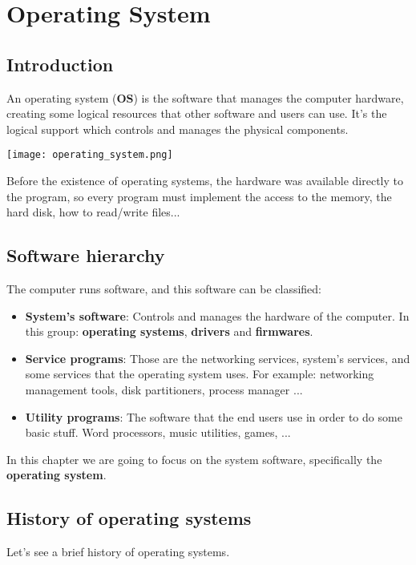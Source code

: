 \chapter{Operating System}

\section{Introduction}

An operating system (\textbf{OS}) is the software that manages the computer hardware, creating some logical resources that other software and users can use. It's the logical support which controls and manages the physical components.

\begin{center}
    \texttt{[image: operating\_system.png]}
\end{center}

Before the existence of operating systems, the hardware was available directly to the program, so every program must implement the access to the memory, the hard disk, how to read/write files...

\section{Software hierarchy}
The computer runs software, and this software can be classified:

\begin{itemize}
    \item \textbf{System's software}: Controls and manages the hardware of the computer. In this group: \textbf{operating systems}, \textbf{drivers} and \textbf{firmwares}.

    \item \textbf{Service programs}: Those are the networking services, system's services, and some services that the operating system uses. For example: networking management tools, disk partitioners, process manager ...

    \item \textbf{Utility programs}: The software that the end users use in order to do some basic stuff. Word processors, music utilities, games, ...
\end{itemize}

In this chapter we are going to focus on the system software, specifically the \textbf{operating system}.


\section{History of operating systems}
Let's see a brief history of operating systems.

